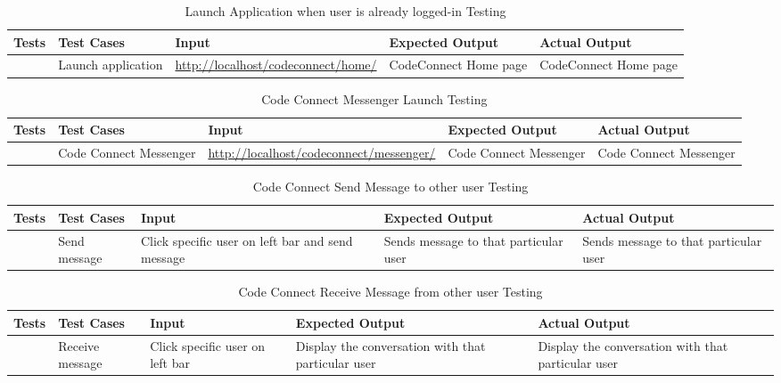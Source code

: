 \begin{table}[H]
    \caption{Launch Application when user is already logged-in Testing}
        \label{}
        \begin{tabularx}{\textwidth}{|>{\raggedright\arraybackslash}p{0.3in}|Y|Y|Y|Y|}
        \hline
        Tests & Test Cases & Input &Expected Output & Actual Output \\
         & Launch application& \url{http://localhost/codeconnect/home/}& CodeConnect Home page& CodeConnect Home page \\
            \hline
\end{tabularx}
\end{table}

\begin{table}[H]
    \caption{Code Connect Messenger Launch Testing}
        \label{}
        \begin{tabularx}{\textwidth}{|>{\raggedright\arraybackslash}p{0.3in}|Y|Y|Y|Y|}
        \hline
        Tests & Test Cases & Input &Expected Output & Actual Output \\
         & Code Connect Messenger& \url{http://localhost/codeconnect/messenger/}& Code Connect Messenger&  Code Connect Messenger \\
            \hline
\end{tabularx}
\end{table}
\begin{table}[H]
    \caption{Code Connect Send Message to other user Testing}
        \label{}
        \begin{tabularx}{\textwidth}{|>{\raggedright\arraybackslash}p{0.3in}|Y|Y|Y|Y|}
        \hline
        Tests & Test Cases & Input &Expected Output & Actual Output \\
         & Send message& Click specific user on left bar and send message & Sends message to that particular user& Sends message to that particular user \\
            \hline
\end{tabularx}
\end{table}

\begin{table}[H]
    \caption{Code Connect Receive Message from other user Testing}
        \label{}
        \begin{tabularx}{\textwidth}{|>{\raggedright\arraybackslash}p{0.3in}|Y|Y|Y|Y|}
        \hline
        Tests & Test Cases & Input &Expected Output & Actual Output \\
         & Receive message& Click specific user on left bar& Display the conversation with that particular user& Display the conversation with that particular user\\
            \hline
\end{tabularx}
\end{table}

